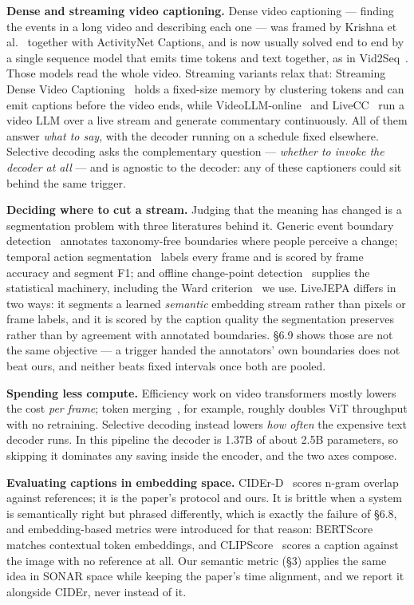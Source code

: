 \textbf{Dense and streaming video captioning.} Dense video captioning --- finding the events in a long video and describing each one --- was framed by Krishna et al.~\cite{densecap2017} together with ActivityNet Captions, and is now usually solved end to end by a single sequence model that emits time tokens and text together, as in Vid2Seq~\cite{vid2seq2023}. Those models read the whole video. Streaming variants relax that: Streaming Dense Video Captioning~\cite{streamingdvc2024} holds a fixed-size memory by clustering tokens and can emit captions before the video ends, while VideoLLM-online~\cite{videollmonline2024} and LiveCC~\cite{livecc2025} run a video LLM over a live stream and generate commentary continuously. All of them answer \emph{what to say}, with the decoder running on a schedule fixed elsewhere. Selective decoding asks the complementary question --- \emph{whether to invoke the decoder at all} --- and is agnostic to the decoder: any of these captioners could sit behind the same trigger.

\textbf{Deciding where to cut a stream.} Judging that the meaning has changed is a segmentation problem with three literatures behind it. Generic event boundary detection~\cite{gebd2021} annotates taxonomy-free boundaries where people perceive a change; temporal action segmentation~\cite{tas2023} labels every frame and is scored by frame accuracy and segment F1; and offline change-point detection~\cite{changepoint2020} supplies the statistical machinery, including the Ward criterion~\cite{ward1963} we use. LiveJEPA differs in two ways: it segments a learned \emph{semantic} embedding stream rather than pixels or frame labels, and it is scored by the caption quality the segmentation preserves rather than by agreement with annotated boundaries. \S6.9 shows those are not the same objective --- a trigger handed the annotators' own boundaries does not beat ours, and neither beats fixed intervals once both are pooled.

\textbf{Spending less compute.} Efficiency work on video transformers mostly lowers the cost \emph{per frame}; token merging~\cite{tome2023}, for example, roughly doubles ViT throughput with no retraining. Selective decoding instead lowers \emph{how often} the expensive text decoder runs. In this pipeline the decoder is 1.37B of about 2.5B parameters, so skipping it dominates any saving inside the encoder, and the two axes compose.

\textbf{Evaluating captions in embedding space.} CIDEr-D~\cite{cider2015} scores n-gram overlap against references; it is the paper's protocol and ours. It is brittle when a system is semantically right but phrased differently, which is exactly the failure of \S6.8, and embedding-based metrics were introduced for that reason: BERTScore~\cite{bertscore2020} matches contextual token embeddings, and CLIPScore~\cite{clipscore2021} scores a caption against the image with no reference at all. Our semantic metric (\S3) applies the same idea in SONAR space while keeping the paper's time alignment, and we report it alongside CIDEr, never instead of it.

